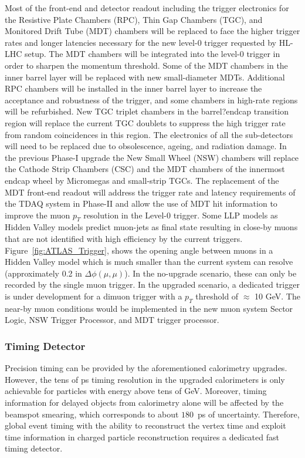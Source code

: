 Most of the front-end and detector readout including the trigger electronics for the Resistive Plate Chambers (RPC), Thin Gap Chambers (TGC),
and Monitored Drift Tube (MDT) chambers will be replaced to face
the higher trigger rates and longer latencies necessary for the new level-0 trigger requested by HL-LHC setup. 
The MDT chambers will be integrated into the level-0 trigger in order to sharpen the momentum threshold. Some of the MDT chambers in the inner barrel layer will be replaced with new small-diameter MDTs. 
Additional RPC chambers will be installed in the inner barrel layer to increase the
acceptance and robustness of the trigger, and some chambers in high-rate regions will be
refurbished. 
New TGC triplet chambers in the barrel?endcap transition region will replace the current TGC doublets to suppress the high trigger rate from random
coincidences in this region. 
The electronics of all the sub-detectors will need to be replaced due to obsolescence, ageing, and radiation
damage. 
In the previous Phase-I upgrade the New Small Wheel (NSW) chambers will replace the Cathode Strip Chambers (CSC) and
the MDT chambers of the innermost endcap wheel by Micromegas and small-strip TGCs.
The replacement of the MDT front-end readout will address the trigger rate
and latency requirements of the TDAQ system in Phase-II and allow the use of MDT hit
information to improve the muon $p_T$ resolution in the Level-0 trigger.
Some LLP models as Hidden Valley models predict muon-jets  as final state  resulting in close-by muons that are not identified with high efficiency by the current triggers.
Figure~\ref{fig:ATLAS_Trigger}, shows the opening angle between muons in a Hidden Valley model which
is much smaller than the current system can resolve (approximately 0.2 in $\Delta\phi(\mu,\mu)$). In
the no-upgrade scenario, these can only be recorded by the single muon trigger. In the upgraded scenario,
a dedicated trigger is under development for a dimuon trigger with a $p_T$
threshold of $\approx$ 10 GeV. The near-by muon conditions would be implemented in the new muon system
Sector Logic, NSW Trigger Processor, and MDT trigger processor.




\subsubsection{Timing Detector} \label{sec:upgradetiming}

Precision timing can be provided by the aforementioned calorimetry upgrades. 
However, the tens of ps timing resolution in the upgraded calorimeters is only achievable for particles with energy above tens of GeV. 
Moreover, timing information for delayed objects from calorimetry alone will be affected by the beamspot smearing, which corresponds to about $180$~ps of uncertainty.
Therefore, global event timing with the ability to reconstruct the vertex time and exploit time information in charged particle reconstruction requires a dedicated fast timing detector.


